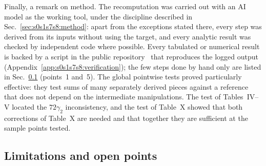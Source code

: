 \documentclass[aps,prd,onecolumn,10pt,nofootinbib,floatfix]{revtex4-2}
\begin{document}
Finally, a remark on method. The recomputation was carried out with an AI model as the working tool, under the discipline described in
Sec.~\ref{sec:s0s1s7s8:method}: apart from the exceptions stated there, every step was derived from its inputs without using the
target, and every analytic result was checked by independent code where possible. Every tabulated or numerical result is backed by a
script in the public repository~\cite{ref:repo} that reproduces the logged output (Appendix~\ref{app:s0s1s7s8:verification}); the few
steps done by hand only are listed in Sec.~\ref{sec:s0s1s7s8:limitations} (points~1 and~5). The global pointwise tests proved particularly effective: they test
sums of many separately derived pieces against a reference that does not depend on the intermediate manipulations. The test of
Tables~IV--V located the $72\gamma_2$ inconsistency, and the test of Table~X showed that both corrections of Table~X are needed and
that together they are sufficient at the sample points tested.

\subsection{Limitations and open points}
\label{sec:s0s1s7s8:limitations}
\end{document}
